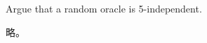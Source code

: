 \startEXERCISE\DIFFICULT
Argue that a random oracle is 5-independent.
\stopEXERCISE

\startANSWER
略。
\stopANSWER